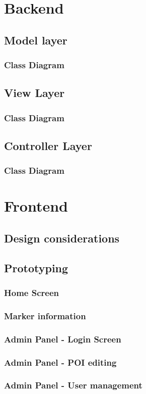 \section{Backend}

\subsection{Model layer}

\subsubsection{Class Diagram}

\subsection{View Layer}

\subsubsection{Class Diagram}

\subsection{Controller Layer}

\subsubsection{Class Diagram}


\section{Frontend}

\subsection{Design considerations}

\subsection{Prototyping}

\subsubsection{Home Screen}


\subsubsection{Marker information}

\subsubsection{Admin Panel - Login Screen}
\subsubsection{Admin Panel - POI editing}

\subsubsection{Admin Panel - User management}
